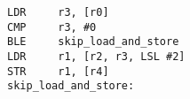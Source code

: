 \begin{lstlisting}[style=AsmStyle]
LDR     r3, [r0]        
CMP     r3, #0          
BLE     skip_load_and_store
LDR     r1, [r2, r3, LSL #2] 
STR     r1, [r4]
skip_load_and_store:
\end{lstlisting}
